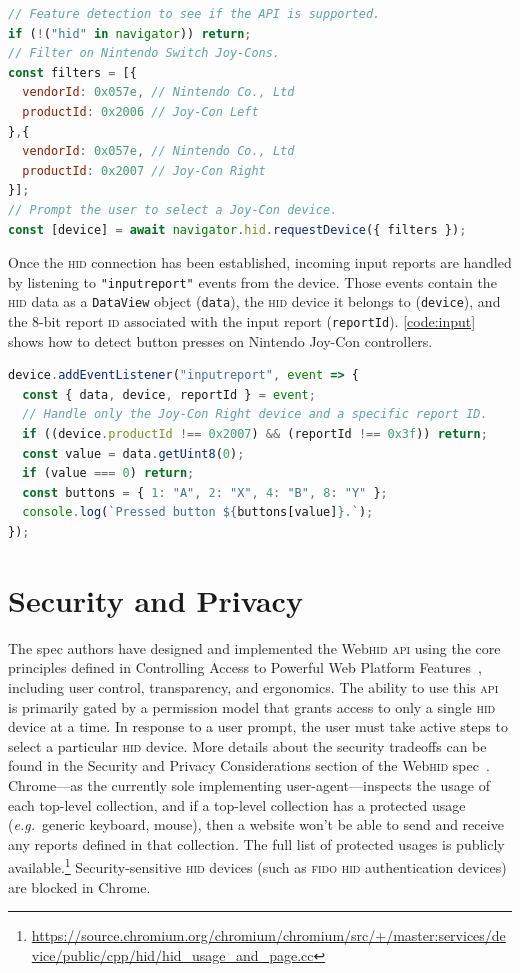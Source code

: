 \documentclass[sigconf]{acmart}
\begin{document}
\begin{lstlisting}[language=JavaScript, style=ES6, caption={Connecting to Nintendo Joy-Con controllers}, label={code:connect}]
// Feature detection to see if the API is supported.
if (!("hid" in navigator)) return;
// Filter on Nintendo Switch Joy-Cons.
const filters = [{
  vendorId: 0x057e, // Nintendo Co., Ltd
  productId: 0x2006 // Joy-Con Left
},{
  vendorId: 0x057e, // Nintendo Co., Ltd
  productId: 0x2007 // Joy-Con Right
}];
// Prompt the user to select a Joy-Con device.
const [device] = await navigator.hid.requestDevice({ filters });
\end{lstlisting}

Once the \textsc{hid} connection has been established, incoming input reports are handled
by listening to \texttt{"inputreport"} events from the device.
Those events contain the \textsc{hid} data as a
\texttt{DataView} object (\texttt{data}),
the \textsc{hid} device it belongs to (\texttt{device}),
and the 8-bit report \textsc{id} associated with the input report (\texttt{reportId}).
\autoref{code:input} shows how to detect button presses on Nintendo Joy-Con controllers.

\begin{lstlisting}[language=JavaScript, style=ES6, caption={Listening to Joy-Con controller input reports}, label={code:input}]
device.addEventListener("inputreport", event => {
  const { data, device, reportId } = event;
  // Handle only the Joy-Con Right device and a specific report ID.
  if ((device.productId !== 0x2007) && (reportId !== 0x3f)) return;
  const value = data.getUint8(0);
  if (value === 0) return;
  const buttons = { 1: "A", 2: "X", 4: "B", 8: "Y" };
  console.log(`Pressed button ${buttons[value]}.`);
});
\end{lstlisting}

\section{Security and Privacy}

The spec authors have designed and implemented the Web\textsc{hid} \textsc{api}
using the core principles defined in
Controlling Access to Powerful Web Platform Features~\cite{ng19},
including user control, transparency, and ergonomics.
The ability to use this \textsc{api} is primarily gated by a permission model
that grants access to only a single \textsc{hid} device at a time.
In response to a user prompt, the user must take active steps
to select a particular \textsc{hid} device.
More details about the security tradeoffs can be found in
the Security and Privacy Considerations section of the Web\textsc{hid} spec~\cite{hid01}.
Chrome---as the currently sole implementing user-agent---inspects
the usage of each top-level collection,
and if a top-level collection has a protected usage
(\textit{e.g.}\ generic keyboard, mouse), then a website won't be able to send and receive
any reports defined in that collection.
The full list of protected usages is publicly
available.\footnote{\url{https://source.chromium.org/chromium/chromium/src/+/master:services/device/public/cpp/hid/hid_usage_and_page.cc}}
Security-sensitive \textsc{hid} devices
(such as \textsc{fido} \textsc{hid} authentication devices)
are blocked in Chrome.
\end{document}
